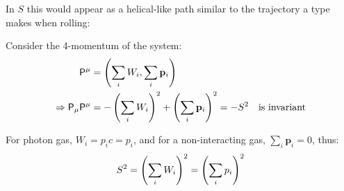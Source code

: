 \begin{parts}
	In $S$ this would appear as a helical-like path similar to the trajectory a type makes when rolling:
	
	Consider the 4-momentum of the system:
	\begin{align*}
		\mathsf{P}^\mu &= \left(\sum_i W_i, \sum_i \mathbf{p}_i\right) \\
		\Rightarrow \mathsf{P}_\mu \mathsf{P}^\mu &= -\left(\sum_i W_i\right)^2 + \left(\sum_i \mathbf{p}_i\right)^2 = -S^2 \textnormal{\hspace{1em}is invariant}
	\end{align*}
	
	For photon gas, $W_i = p_i c = p_i$, and for a non-interacting gas, $\sum_i \mathbf{p}_i = 0$, thus:
	\begin{equation*}
		S^2 = \left(\sum_i W_i\right)^2 = \left(\sum_i p_i\right)^2
	\end{equation*}
\end{parts}